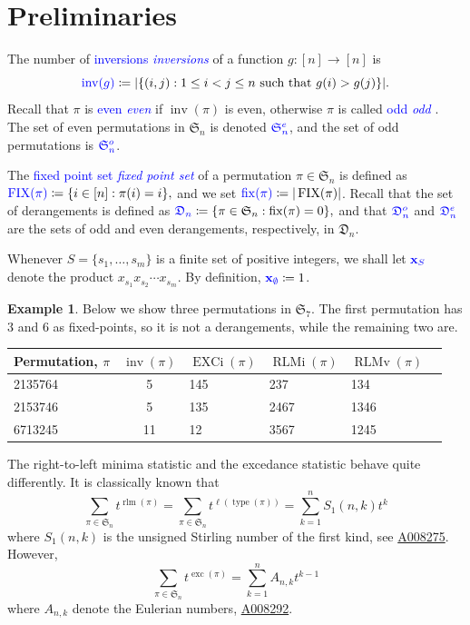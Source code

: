 \documentclass[reqno]{amsart}
\theoremstyle{definition}
\newtheorem{example}[theorem]{Example}
\newcommand{\stirlingOne}[2]{{S_1(#1,#2)}}
\newcommand{\defin}[1]{%
\relax\ifmmode%
\textcolor{blue}{#1}%
\else\textcolor{blue}{\emph{#1}}%
\fi%
}
\newcommand{\oeis}[1]{\href{http://oeis.org/#1}{#1}}
\newcommand{\xvec}{\mathbf{x}}
\newcommand{\symS}{\mathfrak{S}}
\newcommand{\dArr}{\mathfrak{D}}
\DeclareMathOperator{\inv}{inv}
\DeclareMathOperator{\type}{type}
\DeclareMathOperator{\length}{\ell}
\DeclareMathOperator{\fix}{fix}
\DeclareMathOperator{\FIX}{FIX}
\DeclareMathOperator{\exc}{exc}
\DeclareMathOperator{\EXCi}{EXCi}
\DeclareMathOperator{\rlm}{rlm}
\DeclareMathOperator{\RLMv}{RLMv}
\DeclareMathOperator{\RLMi}{RLMi}
\begin{document}
\section{Preliminaries}\label{sec:prelim}


The number of \defin{inversions} of a function $g:[n]\to [n]$ is
\begin{equation}\label{eq:invDef}
\defin{\inv(g)} \coloneqq |\{ (i,j) : 1\leq i < j \leq n \text{ such that } g(i)>g(j) \}|.
\end{equation}
%
Recall that $\pi$ is \defin{even} if $\inv(\pi)$ is even, otherwise $\pi$ is called \defin{odd}. 
The set of even permutations in $\symS_n$ is denoted $\defin{\symS^e_n}$,
and the set of odd permutations is $\defin{\symS^o_n}$.

\medskip 

The \defin{fixed point set} of a permutation $\pi \in \symS_n$ is defined as
$
  \defin{\FIX(\pi)} \coloneqq \{ i \in [n] : \pi(i) = i \},
$
and we set $\defin{\fix(\pi)} \coloneqq |\FIX(\pi)|$.
Recall that the set of derangements is defined as
$
 \defin{\dArr_n} \coloneqq \{ \pi \in \symS_n : \fix(\pi) = 0 \},
$
and that $\defin{\dArr^o_n}$ and $\defin{\dArr^e_n}$
are the sets of odd and even derangements, respectively, in $\dArr_n$.

Whenever $S = \{s_1,\dotsc,s_m\}$ is a finite set of positive integers,
we shall let $\defin{\xvec_S}$ denote the product $x_{s_1}x_{s_2}\dotsm x_{s_m}$.
By definition, $\defin{\xvec_\emptyset} \coloneqq 1$.


\begin{example}
Below we show three permutations in $\symS_7$.
The first permutation has $3$ and $6$ as fixed-points, so it is not a derangements,
while the remaining two are.
\begin{center}
 \begin{tabular}{l c llll}
  Permutation, $\pi$ & $\inv(\pi)$ & $\EXCi(\pi)$ &  $\RLMi(\pi)$ & $\RLMv(\pi)$  \\
  \midrule 
 2135764 & 5 & 145 & 237 & 134  \\
 2153746 & 5 & 135 & 2467 & 1346  \\
 6713245 & 11 & 12 & 3567 & 1245 
 \end{tabular}
\end{center}
\end{example}

The right-to-left minima statistic and the excedance statistic 
behave quite differently. It is classically known that
\[
   \sum_{\pi \in \symS_n} t^{\rlm(\pi)} = 
   \sum_{\pi \in \symS_n} t^{\length(\type(\pi))} =
   \sum_{k=1}^n \stirlingOne{n}{k} t^k 
\]
where $\stirlingOne{n}{k}$ is the unsigned Stirling number of the first kind,
see \oeis{A008275}.
%
However,
\[
 \sum_{\pi \in \symS_n} t^{\exc(\pi)} = 
 \sum_{k=1}^{n} A_{n,k} t^{k-1} 
\]
where $A_{n,k}$ denote the Eulerian numbers, \oeis{A008292}.
\end{document}
